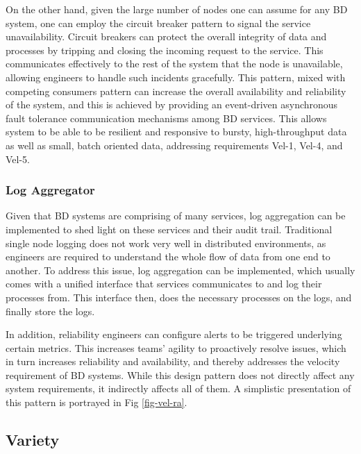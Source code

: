 \documentclass{bmcart}
\begin{document}
On the other hand, given the large number of nodes one can assume for any BD system, one can employ the circuit breaker pattern to signal the service unavailability. Circuit breakers can protect the overall integrity of data and processes by tripping and closing the incoming request to the service. This communicates effectively to the rest of the system that the node is unavailable, allowing engineers to handle such incidents gracefully. This pattern, mixed with competing consumers pattern can increase the overall availability and reliability of the system, and this is achieved by providing an event-driven asynchronous fault tolerance communication mechanisms among BD services. This allows system to be able to be resilient and responsive to bursty, high-throughput data as well as small, batch oriented data, addressing requirements Vel-1, Vel-4, and Vel-5. 
    
\subsubsection{Log Aggregator}

Given that BD systems are comprising of many services, log aggregation can be implemented to shed light on these services and their audit trail. Traditional single node logging does not work very well in distributed environments, as engineers are required to understand the whole flow of data from one end to another. To address this issue, log aggregation can be implemented, which usually comes with a unified interface that services communicates to and log their processes from. This interface then, does the necessary processes on the logs, and finally store the logs. 

In addition, reliability engineers can configure alerts to be triggered underlying certain metrics. This increases teams' agility to proactively resolve issues, which in turn increases reliability and availability, and thereby addresses the velocity requirement of BD systems. While this design pattern does not directly affect any system requirements, it indirectly affects all of them. A simplistic presentation of this pattern is portrayed in Fig \ref{fig-vel-ra}. 



\subsection{Variety}
\end{document}
